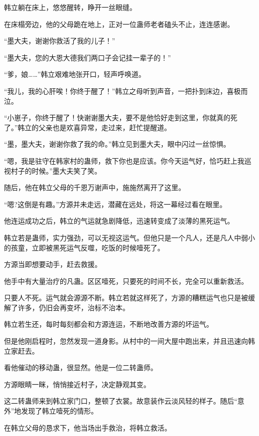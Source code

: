 
\begin{this_body}

韩立躺在床上，悠悠醒转，睁开一丝眼缝。

在床榻旁边，他的父母跪在地上，正对一位蛊师老者磕头不止，连连感谢。

“墨大夫，谢谢你救活了我的儿子！”

“墨大夫，您的大恩大德我们两口子会记挂一辈子的！”

“爹，娘……”韩立艰难地张开口，轻声呼唤道。

“我儿，我的心肝唉！你终于醒了！”韩立之母听到声音，一把扑到床边，喜极而泣。

“小崽子，你终于醒了！快谢谢墨大夫，要不是他恰好走到这里，你就真的死了。”韩立的父亲也是欢喜异常，走过来，赶忙提醒道。

“墨，墨大夫，谢谢你救了我的命。”韩立见到墨大夫，眼中闪过一丝惊惧。

“嗯，我是驻守在韩家村的蛊师，救下你也是应该。你今天运气好，恰巧赶上我巡视村子的时候。”墨大夫笑了笑。

随后，他在韩立父母的千恩万谢声中，施施然离开了这里。

“嗯?这倒是有趣。”方源并未走远，潜藏在远处，将这一幕经过看在眼里。

他连运成功之后，韩立的气运就急剧降低，迅速转变成了淡薄的黑死运气。

韩立若是蛊师，实力强劲，可以无视这运气。但他只是一个凡人，还是凡人中弱小的孩童，立即被黑死运气反噬，吃饭的时候噎死了。

方源当即想要动手，赶去救援。

他手中有大量治疗的凡蛊。区区噎死，只要死的时间不长，完全可以重新救活。

只要人不死。运气就会源源不断。韩立若就这样死了，方源的糟糕运气也只是被缓解了许多，仍旧会再变坏，治标不治本。

韩立若生还，每时每刻都会和方源连运，不断地改善方源的坏运气。

但是他刚启程时，忽然发现一道身影。从村中的一间大屋中跑出来，并且迅速向韩立家赶去。

看他催动的移动蛊，很显然。他是一位二转蛊师。

方源眼睛一眯，悄悄接近村子，决定静观其变。

这二转蛊师来到韩立家门口，整顿了衣裳。故意装作云淡风轻的样子。随后“意外”地发现了韩立噎死的情形。

在韩立父母的恳求下，他当场出手救治，将韩立救活。


\end{this_body}
